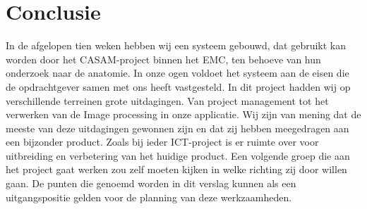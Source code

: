 \section{Conclusie}
\label{Conclusie}
In de afgelopen tien weken hebben wij een systeem gebouwd, dat gebruikt kan worden door het CASAM-project binnen het EMC, ten behoeve van hun onderzoek naar de anatomie.
In onze ogen voldoet het systeem aan de eisen die de opdrachtgever samen met ons heeft vastgesteld. 
In dit project hadden wij op verschillende terreinen grote uitdagingen.
Van project management tot het verwerken van de Image processing in onze applicatie.
Wij zijn van mening dat de meeste van deze uitdagingen gewonnen zijn en dat zij hebben meegedragen aan een bijzonder product. 
Zoals bij ieder ICT-project is er ruimte over voor uitbreiding en verbetering van het huidige product.
Een volgende groep die aan het project gaat werken zou zelf moeten kijken in welke richting zij door willen gaan.
De punten die genoemd worden in dit verslag kunnen als een uitgangspositie gelden voor de planning van deze werkzaamheden.